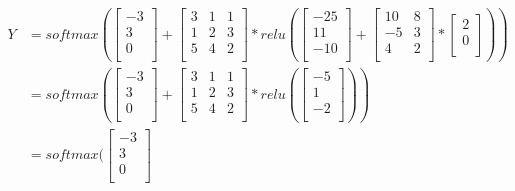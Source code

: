 \documentclass[
	12pt, %
]{fphw}
\begin{document}
\begin{equation}
\begin{split}
	Y &=softmax(
		\begin{bmatrix}
			-3	\\
			3	\\
			0	\\
		\end{bmatrix}
		+
		\begin{bmatrix}
			3	&	1	&	1\\
			1	&	2	&	3\\
			5	&	4	&	2\\
		\end{bmatrix}
		*
		relu(
			\begin{bmatrix}
				-25	\\
				11	\\
				-10	\\
			\end{bmatrix}
			+
			\begin{bmatrix}
				10	& 8	\\
				-5 	& 3	\\
				4 	& 2	\\
			\end{bmatrix}
			*
			\begin{bmatrix}
				2	\\
				0	\\
			\end{bmatrix}
		)
	) \\
	&=softmax(
		\begin{bmatrix}
			-3	\\
			3	\\
			0	\\
		\end{bmatrix}
		+
		\begin{bmatrix}
			3	&	1	&	1\\
			1	&	2	&	3\\
			5	&	4	&	2\\
		\end{bmatrix}
		*
		relu(
			\begin{bmatrix}
				-5	\\
				1	\\
				-2	\\
			\end{bmatrix}
		)
	)\\
	&=softmax(
		\begin{bmatrix}
			-3	\\
			3	\\
			0	\\
		\end{bmatrix}

\end{split}
\end{equation}
\end{document}
